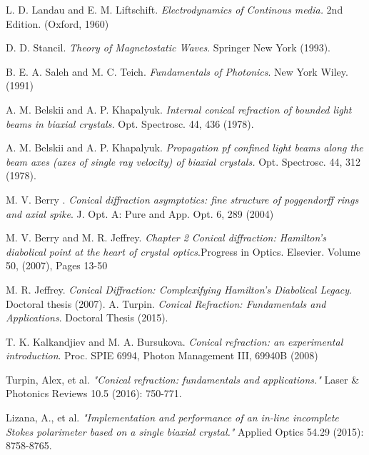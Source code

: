 \documentclass[11pt, a4paper, twoside]{article} %
\begin{document}
\fancyhead[EL]{\em }

\newpage
\fancyhead[OL]{}
\fancyhead[OR]{}
\fancyhead[EL]{}
\fancyhead[ER]{}



\newpage
\begin{thebibliography}{1}
L. D. Landau and E. M. Liftschift. {\em Electrodynamics of Continous media.} 2nd Edition. (Oxford, 1960)

D. D. Stancil. {\em Theory of Magnetostatic Waves}. Springer New York (1993).

B. E. A. Saleh and M. C. Teich. {\em Fundamentals of Photonics}. New York Wiley. (1991)

A. M. Belskii and A. P. Khapalyuk. {\em Internal conical refraction of bounded light beams in biaxial crystals.} Opt. Spectrosc. 44, 436 (1978).

A. M. Belskii and A. P. Khapalyuk. {\em Propagation pf confined light beams along the beam axes (axes of single ray velocity) of biaxial crystals.} Opt. Spectrosc. 44, 312 (1978).

M. V. Berry . {\em Conical diffraction asymptotics: fine structure of poggendorff rings and axial spike}. J. Opt. A: Pure and App. Opt. 6, 289 (2004)

M. V. Berry and M. R. Jeffrey. {\em Chapter 2 Conical diffraction: Hamilton's diabolical point at the heart of crystal optics}.Progress in Optics. Elsevier. Volume 50, (2007), Pages 13-50

M. R. Jeffrey. {\em Conical Diffraction: Complexifying
Hamilton’s Diabolical Legacy}. Doctoral thesis (2007).
A. Turpin. {\em Conical Refraction: Fundamentals and Applications}. Doctoral Thesis (2015).

T. K. Kalkandjiev and M. A. Bursukova. {\em Conical refraction: an experimental introduction}. Proc. SPIE 6994, Photon Management III, 69940B (2008)

Turpin, Alex, et al. {\em "Conical refraction: fundamentals and applications."} Laser \& Photonics Reviews 10.5 (2016): 750-771.

Lizana, A., et al. {\em "Implementation and performance of an in-line incomplete Stokes polarimeter based on a single biaxial crystal."} Applied Optics 54.29 (2015): 8758-8765.


\end{thebibliography}
\end{document}
